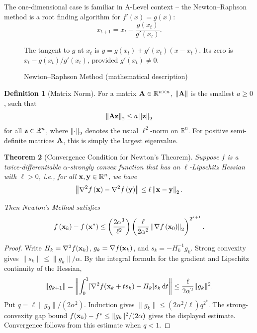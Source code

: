 \documentclass[11pt]{article}
\newtheorem{theorem}{Theorem}[section]
\theoremstyle{definition}
\newtheorem{definition}[theorem]{Definition}
\theoremstyle{remark}
\newcommand{\pqty}[1]{\left(#1\right)}
\newcommand{\RR}{\mathbb{R}}
\newcommand{\grad}{\nabla}
\begin{document}
The one-dimensional case is familiar in A-Level context -- the Newton--Raphson method is a root finding algorithm for \(f'\pqty{x} = g\pqty{x}\):
\[
    x_{t + 1} = x_t - \frac{g\pqty{x_t}}{g'\pqty{x_t}}.
\]

\begin{figure}[ht!]\centering\begin{minipage}{0.94\linewidth}The tangent to \(g\) at \(x_t\) is \(y=g(x_t)+g\prime(x_t)(x-x_t)\). Its zero is \(x_t-g(x_t)/g\prime(x_t)\), provided \(g\prime(x_t)\ne0\).\end{minipage}\caption{Newton--Raphson Method (mathematical description)}\label{fig:newton-raphson}\end{figure}

\begin{definition}[Matrix Norm]\label{optim-unit-0020}
    \label{def:matirx-norm}%
    For a matrix \(\vb{A} \in \RR^{n \times n}\), \(\norm{\vb{A}}\) is the smallest \(a \geq 0\), such that
    \[
        \norm[2]{\vb{Az}} \leq a \norm[2]{\vb{z}}
    \]
    for all \(\vb{z} \in \RR^n\), where \(\norm[2]{\cdot}\) denotes the usual \(\ell^2\)-norm on \(\RR^n\). For positive semi-definite matrices \(\vb{A}\), this is simply the largest eigenvalue.
\end{definition}

\begin{theorem}[Convergence Condition for Newton's Theorem]\label{optim-unit-0021}
    \label{thm:newton-algorithm-convergence}%
    Suppose \(f\) is a twice-differentiable \(\alpha\)-strongly convex function that has an \(\ell\)-Lipschitz Hessian with \(\ell>0\), i.e., for all \(\vb{x}, \vb{y} \in \RR^n\), we have
    \[
        \norm{\grad^2 f\pqty{\vb{x}} - \grad^2 f\pqty{\vb{y}}} \leq \ell \norm[2]{\vb{x} - \vb{y}}.
    \]

    Then Newton's Method satisfies
    \[
        f\pqty{\vb{x}_k} - f\pqty{\vb{x}^{\ast}} \leq \pqty{\frac{2 \alpha^3}{\ell^2}} \pqty{\frac{\ell}{2 \alpha^2} \norm[2]{\grad f\pqty{\vb{x}_0}}}^{2^{k + 1}}.
    \]
\end{theorem}
\begin{proof}
Write \(H_k=\grad^2f(\vb{x}_k)\), \(g_k=\grad f(\vb{x}_k)\), and
\(s_k=-H_k^{-1}g_k\). Strong convexity gives \(\|s_k\|\le\|g_k\|/\alpha\).
By the integral formula for the gradient and Lipschitz continuity of the Hessian,
\[
\|g_{k+1}\|=\left\|\int_0^1[\grad^2f(\vb{x}_k+t s_k)-H_k]s_k\,\mathrm{d}t\right\|
\le\frac{\ell}{2\alpha^2}\|g_k\|^2.
\]
Put \(q=\ell\|g_0\|/(2\alpha^2)\). Induction gives
\(\|g_k\|\le(2\alpha^2/\ell)q^{2^k}\).
The strong-convexity gap bound \(f(\vb{x}_k)-f^*\le\|g_k\|^2/(2\alpha)\)
gives the displayed estimate. Convergence follows from this estimate when \(q<1\).
\end{proof}
\end{document}
